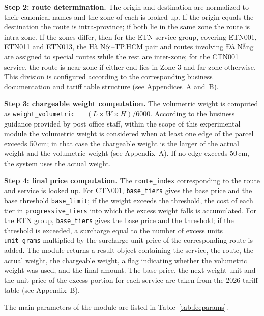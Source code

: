 \textbf{Step 2: route determination.} The origin and destination are normalized to their canonical names and the zone of each is looked up. If the origin equals the destination the route is intra-province; if both lie in the same zone the route is intra-zone. If the zones differ, then for the ETN service group, covering ETN001, ETN011 and ETN013, the Hà Nội--TP.HCM pair and routes involving Đà Nẵng are assigned to special routes while the rest are inter-zone; for the CTN001 service, the route is near-zone if either end lies in Zone 3 and far-zone otherwise. This division is configured according to the corresponding business documentation and tariff table structure \cite{vnpost_kb2026, vnpost_tariff2026} (see Appendices~A and~B).

\textbf{Step 3: chargeable weight computation.} The volumetric weight is computed as \texttt{weight\_volumetric} $= (L \times W \times H)/6000$. According to the business guidance provided by post office staff, within the scope of this experimental module the volumetric weight is considered when at least one edge of the parcel exceeds 50\,cm; in that case the chargeable weight is the larger of the actual weight and the volumetric weight \cite{vnpost_kb2026} (see Appendix~A). If no edge exceeds 50\,cm, the system uses the actual weight.

\textbf{Step 4: final price computation.} The \texttt{route\_index} corresponding to the route and service is looked up. For CTN001, \texttt{base\_tiers} gives the base price and the base threshold \texttt{base\_limit}; if the weight exceeds the threshold, the cost of each tier in \texttt{progressive\_tiers} into which the excess weight falls is accumulated. For the ETN group, \texttt{base\_tiers} gives the base price and the threshold; if the threshold is exceeded, a surcharge equal to the number of excess units \texttt{unit\_grams} multiplied by the surcharge unit price of the corresponding route is added. The module returns a result object containing the service, the route, the actual weight, the chargeable weight, a flag indicating whether the volumetric weight was used, and the final amount. The base price, the next weight unit and the unit price of the excess portion for each service are taken from the 2026 tariff table \cite{vnpost_tariff2026} (see Appendix~B).

The main parameters of the module are listed in Table~\ref{tab:feeparams}.

